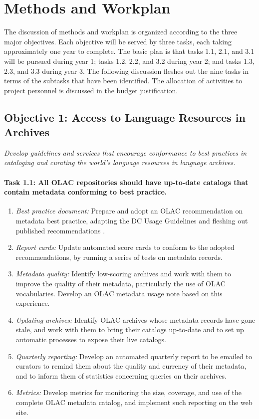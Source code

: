 \section{Methods and Workplan}

The discussion of methods and workplan is organized according to
the three major objectives.  Each objective will be served by
three tasks, each taking approximately one year to complete.
The basic plan is that tasks 1.1, 2.1, and 3.1 will be pursued
during year 1; tasks 1.2, 2.2, and 3.2 during year 2; and tasks 1.3, 2.3, and 3.3 during year 3.
The following discussion fleshes out the nine tasks in terms of the
subtasks that have been identified. The allocation of activities to project
personnel is discussed in the budget justification.


\subsection*{Objective 1: Access to Language Resources in Archives}

\emph{Develop guidelines and services that encourage conformance to best
practices in cataloging and curating the world's language resources
in language archives.}

\def\task{1.1}
\paragraph{Task {\task}: All OLAC repositories should have up-to-date catalogs
      that contain metadata conforming to best practice.}

\begin{enumerate}[label=\emph{\task\alph*}]
\item \emph{Best practice document:}
  Prepare and adopt an OLAC recommendation on metadata best practice,
  adapting the DC Usage Guidelines and fleshing out published recommendations
  \citep{BirdSimons03language,Simons06}.
\item \emph{Report cards:}
  Update automated score cards to conform to the adopted
  recommendations, by running a series of tests on metadata records.
\item \emph{Metadata quality:}
  Identify low-scoring archives and work with them to
  improve the quality of their metadata, particularly the
  use of OLAC vocabularies. 
  Develop an OLAC metadata usage note based on this experience.
\item \emph{Updating archives:}
  Identify OLAC archives whose metadata records have gone stale,
  and work with them to bring their catalogs up-to-date and to
  set up automatic processes to expose their live catalogs.
\item \emph{Quarterly reporting:}
  Develop an automated quarterly report to be emailed to curators to 
  remind them about the quality and currency of their metadata, and to
  inform them of statistics concerning queries on their archives.
\item \emph{Metrics:}
  Develop metrics for monitoring the size, coverage, and use of the 
  complete OLAC metadata catalog, and implement such reporting on the web site.

\end{enumerate}

